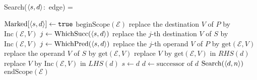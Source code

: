 Search($\left\langle s,d \right\rangle$:~edge) =
\begin{myalgorithmic}
\STATE $\text{Marked}[\left\langle s,d \right\rangle] \gets \texttt{true}$
\STATE $\text{beginScope}(\mathcal{E})$
  \STATE replace the destination $V$ of $P$ by $\text{Inc}(\mathcal{E}, V)$
         \label{line:rendef1}
 \ENDFOR
{}
  \STATE $j \gets \text{WhichSucc}(\left\langle s,d \right\rangle)$
  \STATE replace the $j$-th destination $V$ of $S$ by $\text{Inc}(\mathcal{E}, V)$
         \label{line:rendef2}
 \ENDFOR
\ENDIF
{} \label{line:searchloop_start}
   \STATE $j\gets \text{WhichPred}(\left\langle s,d \right\rangle)$ \label{line:phisrc1}
   \STATE replace the $j$-th operand $V$ of $P$ by $\text{get}(\mathcal{E}, V)$
          \label{line:phisrc2}
  \ENDFOR
  \BREAK {}
   \STATE replace the operand $V$ of $S$ by $\text{get}(\mathcal{E}, V)$
          \label{line:sigsrc}
  \ENDFOR
  \BREAK {}
 \ENDIF
 \STATE{}
        \label{line:rename_ordinary1}
  \STATE replace $V$ by $\text{get}(\mathcal{E}, V)$ in $RHS(d)$
 \ENDFOR
  \STATE replace $V$ by $\text{Inc}(\mathcal{E}, V)$ in $LHS(d)$
         \label{line:rendef3} \label{line:rename_ordinary2}
 \ENDFOR
  \BREAK {}
 \ENDIF
 \STATE $s \gets d$
 \STATE $d \gets \text{successor of }d$ \label{line:search_onesucc}
\ENDLOOP* \label{line:searchloop_end}
  \STATE $\text{Search}(\left\langle d, n \right\rangle)$ 
         \label{line:search2}
 \ENDIF
\ENDFOR
\STATE $\text{endScope}(\mathcal{E})$
\RETURN
\end{myalgorithmic}
